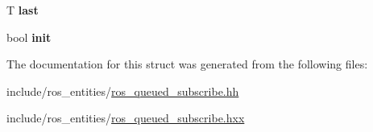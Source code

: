 \begin{DoxyCompactItemize}
\item 
T {\bfseries last}\hypertarget{structdynamic__graph_1_1internal_1_1BindedSignal_a23688c234ce0c8935ed3f52783fa9f2a}{}\label{structdynamic__graph_1_1internal_1_1BindedSignal_a23688c234ce0c8935ed3f52783fa9f2a}

\item 
bool {\bfseries init}\hypertarget{structdynamic__graph_1_1internal_1_1BindedSignal_ac2169fa9a731a30f66805c53af7f55eb}{}\label{structdynamic__graph_1_1internal_1_1BindedSignal_ac2169fa9a731a30f66805c53af7f55eb}

\end{DoxyCompactItemize}


The documentation for this struct was generated from the following files\+:\begin{DoxyCompactItemize}
\item 
include/ros\+\_\+entities/\hyperlink{ros__queued__subscribe_8hh}{ros\+\_\+queued\+\_\+subscribe.\+hh}\item 
include/ros\+\_\+entities/\hyperlink{ros__queued__subscribe_8hxx}{ros\+\_\+queued\+\_\+subscribe.\+hxx}\end{DoxyCompactItemize}
